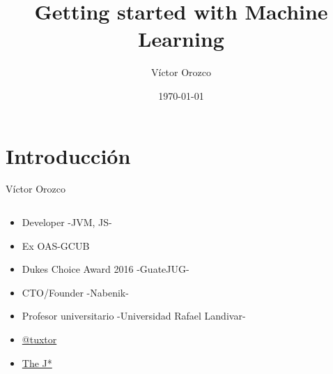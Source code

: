 \documentclass{beamer}
\title{Getting started with Machine Learning}
\author{Víctor Orozco}
\institute{Nabenik}
\date{\today}
\begin{document}
\frame{\titlepage}

\section{Introducción}


\begin{frame}{Víctor Orozco}
    \begin{columns}[T] %
        \begin{column}[T]{5cm} %
            \begin{itemize}
                \item Developer -JVM, JS- 
                \item Ex OAS-GCUB
                \item Dukes Choice Award 2016 -GuateJUG-
                \item CTO/Founder -Nabenik-
                \item Profesor universitario -Universidad Rafael Landivar-
                \item \href{https://twitter.com/tuxtor}{@tuxtor}
                \item \href{http://vorozco.com}{The J*} 
            \end{itemize}
        \end{column}
        \begin{column}[T]{3cm} %
            \begin{figure}
                \centering

\end{figure}
\end{column}
\end{columns}
\end{frame}
\end{document}
